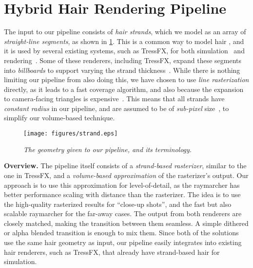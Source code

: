 \documentclass{egpubl}
\begin{document}

\newpage

\section{Hybrid Hair Rendering Pipeline} \label{sec:hybrid_hair_rendering_pipeline}


The input to our pipeline consists of \emph{hair strands}, which we model as an array of \emph{straight-line segments}, as shown in \cref{fig:strand}. This is a common way to model hair \cite{ward2007survey}, and it is used by several existing systems, such as TressFX, for both simulation~\cite{han2014hair} and rendering~\cite{martin2014tressfx}. Some of these renderers, including TressFX, expand these segments into \emph{billboards} to support varying the strand thickness~\cite{yuksel2010advanced}. While there is nothing limiting our pipeline from also doing this, we have chosen to use \emph{line rasterization} directly, as it leads to a fast coverage algorithm, and also because the expansion to camera-facing triangles is expensive~\cite{yuksel2010advanced}. This means that all strands have \emph{constant radius} in our pipeline, and are assumed to be of \emph{sub-pixel} size~\cite{leblanc1991rendering}, to simplify our volume-based technique.

\begin{figure}[htb]
    \centering
    \texttt{[image: figures/strand.eps]}
    \caption{\emph{The geometry given to our pipeline, and its terminology.}}
    \label{fig:strand}
    \vspace{-2mm}
\end{figure}


\noindent \textbf{Overview. } The pipeline itself consists of a \emph{strand-based rasterizer}, similar to the one in TressFX, and a \emph{volume-based approximation} of the rasterizer's output. Our approach is to use this approximation for level-of-detail, as the raymarcher has better performance scaling with distance than the rasterizer. The idea is to use the high-quality rasterized results for ``close-up shots'', and the fast but also scalable raymarcher for the far-away cases. The output from both renderers are closely matched, making the transition between them seamless. A simple dithered or alpha blended transition is enough to mix them. Since both of the solutions use the same hair geometry as input, our pipeline easily integrates into existing hair renderers, such as TressFX, that already have strand-based hair for simulation.
\end{document}
